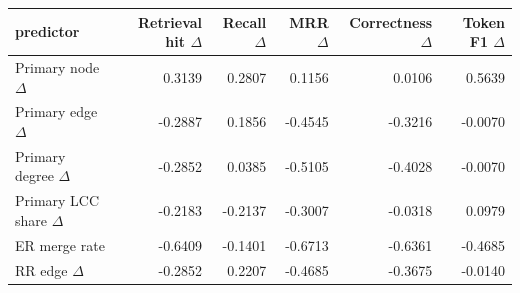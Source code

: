\begin{tabular}{lrrrrr}
\toprule
predictor & Retrieval hit $\Delta$ & Recall $\Delta$ & MRR $\Delta$ & Correctness $\Delta$ & Token F1 $\Delta$ \\
\midrule
Primary node $\Delta$ & 0.3139 & 0.2807 & 0.1156 & 0.0106 & 0.5639 \\
Primary edge $\Delta$ & -0.2887 & 0.1856 & -0.4545 & -0.3216 & -0.0070 \\
Primary degree $\Delta$ & -0.2852 & 0.0385 & -0.5105 & -0.4028 & -0.0070 \\
Primary LCC share $\Delta$ & -0.2183 & -0.2137 & -0.3007 & -0.0318 & 0.0979 \\
ER merge rate & -0.6409 & -0.1401 & -0.6713 & -0.6361 & -0.4685 \\
RR edge $\Delta$ & -0.2852 & 0.2207 & -0.4685 & -0.3675 & -0.0140 \\
\bottomrule
\end{tabular}

